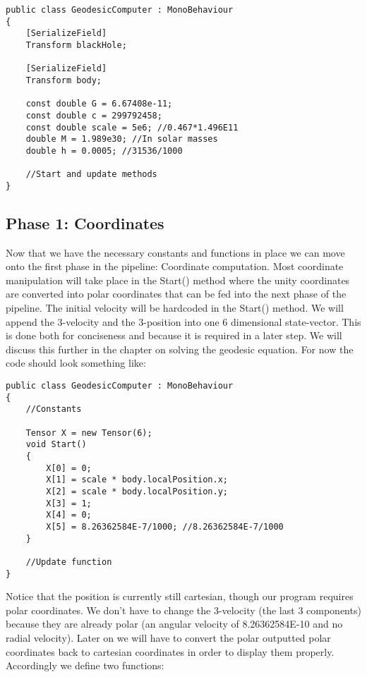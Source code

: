 \documentclass{article}
\begin{document}
\begin{verbatim}
public class GeodesicComputer : MonoBehaviour
{
    [SerializeField]
    Transform blackHole;

    [SerializeField]
    Transform body;

    const double G = 6.67408e-11;
    const double c = 299792458;
    const double scale = 5e6; //0.467*1.496E11
    double M = 1.989e30; //In solar masses
    double h = 0.0005; //31536/1000

    //Start and update methods
}
\end{verbatim}

\newpage
\subsection{Phase 1: Coordinates}
Now that we have the necessary constants and functions in place we can move onto the first phase in the pipeline: Coordinate computation. Most coordinate manipulation will take place in the Start() method where the unity coordinates are converted into polar coordinates that can be fed into the next phase of the pipeline. The initial velocity will be hardcoded in the Start() method. We will append the 3-velocity and the 3-position into one 6 dimensional state-vector. This is done both for conciseness and because it is required in a later step. We will discuss this further in the chapter on solving the geodesic equation. For now the code should look something like:

\begin{verbatim}
public class GeodesicComputer : MonoBehaviour
{
    //Constants

    Tensor X = new Tensor(6);
    void Start()
    {
        X[0] = 0;
        X[1] = scale * body.localPosition.x;
        X[2] = scale * body.localPosition.y;
        X[3] = 1;
        X[4] = 0;
        X[5] = 8.26362584E-7/1000; //8.26362584E-7/1000
    }

    //Update function
}
\end{verbatim}

\newpage
Notice that the position is currently still cartesian, though our program requires polar coordinates. We don't have to change the 3-velocity (the last 3 components) because they are already polar (an angular velocity of 8.26362584E-10 and no radial velocity). Later on we will have to convert the polar outputted polar coordinates back to cartesian coordinates in order to display them properly. Accordingly we define two functions:
\end{document}
